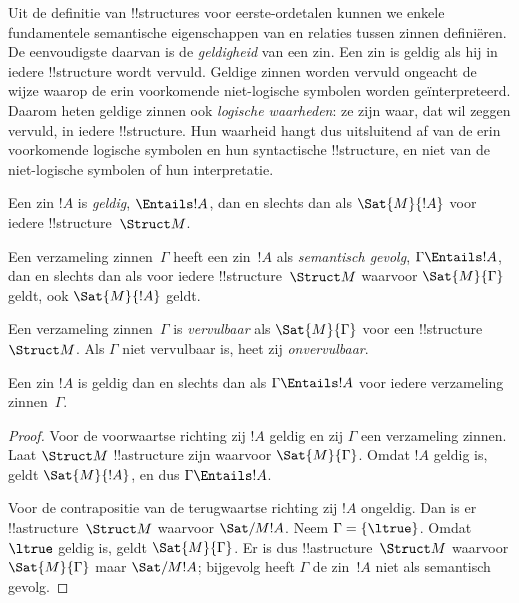 \documentclass[../../../include/open-logic-section]{subfiles}
\begin{document}

\begin{explain}
Uit de definitie van !!{structure}s voor eerste-ordetalen kunnen we
enkele fundamentele semantische eigenschappen van en relaties tussen
zinnen definiëren. De eenvoudigste daarvan is de \emph{geldigheid} van
een zin. Een zin is geldig als hij in iedere !!{structure} wordt
vervuld. Geldige zinnen worden vervuld ongeacht de wijze waarop de
erin voorkomende niet-logische symbolen worden geïnterpreteerd.
Daarom heten geldige zinnen ook \emph{logische waarheden}: ze zijn
waar, dat wil zeggen vervuld, in iedere !!{structure}. Hun waarheid
hangt dus uitsluitend af van de erin voorkomende logische symbolen en
hun syntactische !!{structure}, en niet van de niet-logische symbolen
of hun interpretatie.
\end{explain}

\begin{defn}[Geldigheid]
Een zin $!A$ is \emph{geldig}, $\Entails !A$, dan en slechts dan als
$\Sat{M}{!A}$ voor iedere !!{structure}~$\Struct M$.
\end{defn}

\begin{defn}
Een verzameling zinnen~$\Gamma$ heeft een zin~$!A$ als
\emph{semantisch gevolg}, $\Gamma \Entails !A$, dan en slechts dan als
voor iedere !!{structure}~$\Struct M$ waarvoor $\Sat{M}{\Gamma}$ geldt,
ook $\Sat{M}{!A}$ geldt.
\end{defn}


\begin{defn}[Vervulbaarheid]
Een verzameling zinnen~$\Gamma$ is \emph{vervulbaar} als
$\Sat{M}{\Gamma}$ voor een !!{structure}~$\Struct M$. Als $\Gamma$
niet vervulbaar is, heet zij \emph{onvervulbaar}.
\end{defn}

\begin{prop}
Een zin $!A$ is geldig dan en slechts dan als $\Gamma \Entails !A$
voor iedere verzameling zinnen~$\Gamma$.
\end{prop}

\begin{proof}
Voor de voorwaartse richting zij $!A$ geldig en zij $\Gamma$ een
verzameling zinnen. Laat $\Struct M$ !!a{structure} zijn waarvoor
$\Sat{M}{\Gamma}$. Omdat $!A$ geldig is, geldt $\Sat{M}{!A}$, en dus
$\Gamma \Entails !A$.

Voor de contrapositie van de terugwaartse richting zij $!A$ ongeldig.
Dan is er !!a{structure}~$\Struct M$ waarvoor $\Sat/{M}{!A}$. Neem
$\Gamma = \{ \ltrue \}$. Omdat $\ltrue$ geldig is, geldt
$\Sat{M}{\Gamma}$. Er is dus !!a{structure}~$\Struct M$ waarvoor
$\Sat{M}{\Gamma}$ maar $\Sat/{M}{!A}$; bijgevolg heeft $\Gamma$ de
zin~$!A$ niet als semantisch gevolg.
\end{proof}
\end{document}
